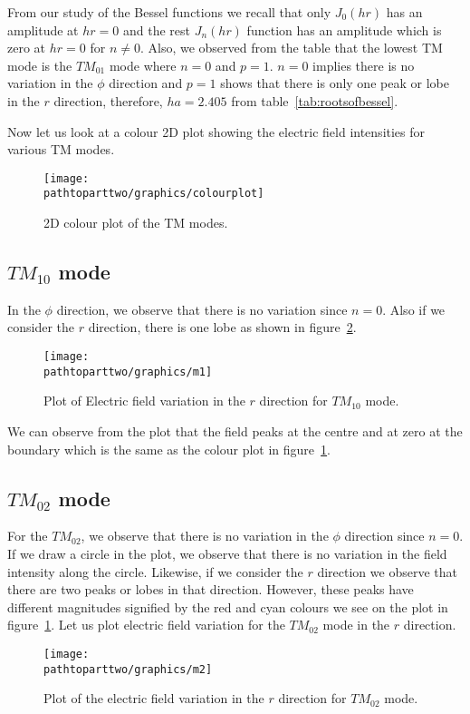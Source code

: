 From our study of the Bessel functions we recall that only $J_0(hr)$ has an amplitude at $hr = 0$ and the rest $J_n(hr)$ function has an amplitude which is zero at $hr = 0$ for $n \ne 0$. Also, we observed from the table that the lowest TM mode is the $TM_{01}$ mode where $n = 0$ and $p = 1$. $n = 0$ implies there is no variation in the $\phi$ direction and $p = 1$ shows that there is only one peak or lobe in the $r$ direction, therefore, $ha = 2.405$ from table~\ref{tab:rootsofbessel}. 

Now let us look at a colour 2D plot showing the electric field intensities for various TM modes.
\begin{figure}[h]
\centering
\texttt{[image: \\pathtoparttwo/graphics/colourplot]}
\caption{2D colour plot of the TM modes.}
\label{fig:colourplot}
\end{figure}

\subsection{$TM_{10}$ mode}
In the $\phi$ direction, we observe that there is no variation since $n=0$. Also if we consider the $r$ direction, there is one lobe as shown in figure~\ref{fig:m1}.
\begin{figure}[h]
\centering
\texttt{[image: \\pathtoparttwo/graphics/m1]}
\caption{Plot of Electric field variation in the $r$ direction for $TM_{10}$ mode.}
\label{fig:m1}
\end{figure}

We can observe from the plot that the field peaks at the centre and at zero at the boundary which is the same as the colour plot in figure~\ref{fig:colourplot}.
      
\subsection{$TM_{02}$ mode}
For the $TM_{02}$, we observe that there is no variation in the $\phi$ direction since $n=0$. If we draw a circle in the plot, we observe that there is no variation in the field intensity along the circle. Likewise, if we consider the $r$ direction we observe that there are two peaks or lobes in that direction. However, these peaks have different magnitudes signified by the red and cyan colours we see on the plot in figure~\ref{fig:colourplot}. Let us plot electric field variation for the $TM_{02}$ mode in the $r$ direction.
\begin{figure}[h]
\centering
\texttt{[image: \\pathtoparttwo/graphics/m2]}
\caption{Plot of the electric field variation in the $r$ direction for $TM_{02}$ mode.}
\label{fig:m2}
\end{figure}

